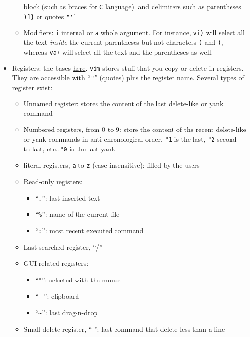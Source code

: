 \documentclass[a4paper,12pt,%
              final%
              ]{article}
\newcommand{\vim}{\texttt{vim}}
\begin{document}
\begin{itemize}
\begin{itemize}
        block (such as braces for \texttt{C} language), and delimiters such as
        parentheses \verb|)]}| or quotes \verb|"'`|
      \item Modifiers: \texttt{i} internal or \texttt{a} whole argument. For
        instance, \texttt{vi)} will select all the text \emph{inside} the current
        parentheses but not characters \texttt{(} and \texttt{)}, whereas
        \texttt{va)} will select all the text and the parentheses as well.
    \end{itemize}
  \item Registers: the bases \href{https://www.brianstorti.com/vim-registers/}{here}.
    \vim{} stores stuff that you copy or delete in registers. They are accessible
    with ``\texttt{"}'' (quotes) plus the register name. Several types of register
    exist:
    \begin{itemize}
      \item Unnamed register: stores the content of the last delete-like or yank
        command
      \item Numbered registers, from 0 to 9: store the content of the recent
        delete-like or yank commands in anti-chronological order. \texttt{"1} is the
        last, \texttt{"2} second-to-last, etc\ldots \texttt{"0} is the last yank
      \item literal registers, \texttt{a} to \texttt{z} (case insensitive): filled by
        the users
      \item Read-only registers:
        \begin{itemize}
          \item ``\texttt{.}'': last inserted text
          \item ``\verb!%!'': name of the current file
          \item ``\texttt{:}'': most recent executed command
        \end{itemize}
      \item Last-searched register, ``/''
      \item GUI-related registers:
        \begin{itemize}
          \item ``*'': selected with the mouse
          \item ``+'': clipboard
          \item ``\verb|~|'': last drag-n-drop
        \end{itemize}
      \item Small-delete register, ``-'': last command that delete less than a line

\end{itemize}
\end{itemize}
\end{document}
